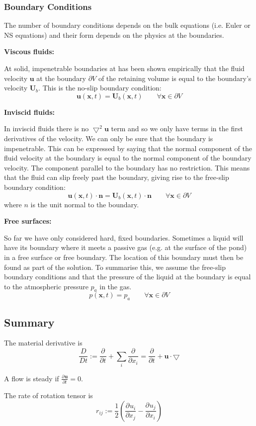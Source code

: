 \documentclass[11pt]{article}
\newcommand*{\pd}[3][]{\ensuremath{\frac{\partial^{#1} {#2}}{\partial {#3}^{#1}}}}
\newcommand*{\md}[1]{\ensuremath{\frac{D #1}{D t}}}
\newcommand{\grad}{\bigtriangledown}
\newcommand{\defeq}{:=}
\newcommand{\mv}[1]{\bm{#1}}
\newcommand{\mdf}[1]{{\color{red}#1}}
\begin{document}
\subsubsection{Boundary Conditions}
The number of boundary conditions depends on the bulk equations (i.e. Euler or NS equations) and their form depends on the physics at the boundaries.

\textbf{Viscous fluids:}

At solid, impenetrable boundaries at has been shown empirically that the fluid velocity $\mv{u}$ at the boundary $\partial V$ of the retaining volume is equal to the boundary's velocity $\mv{U}_b$. This is the \mdf{no-slip boundary condition}:
$$\mv{u}(\mv{x},t)=\mv{U}_b(\mv{x},t)\quad\quad\forall\mv{x}\in\partial V$$

\textbf{Inviscid fluids:}

In inviscid fluids there is no $\grad^2 \mv{u}$ term and so we only have terms in the first derivatives of the velocity.
We can only be sure that the boundary is impenetrable.
This can be expressed by saying that the normal component of the fluid velocity at the boundary is equal to the normal component of the boundary velocity.
The component parallel to the boundary has no restriction.
This means that the fluid can slip freely past the boundary, giving rise to the \mdf{free-slip boundary condition}:
$$\mv{u}(\mv{x},t)\cdot\mv{n}=\mv{U}_b(\mv{x},t)\cdot\mv{n}\quad\quad\forall\mv{x}\in\partial V$$
where $n$ is the unit normal to the boundary.

\textbf{Free surfaces:}

So far we have only considered hard, fixed boundaries. Sometimes a liquid will have its boundary where it meets a passive gas (e.g. at the surface of the pond) in a \mdf{free surface} or \mdf{free boundary}.
The location of this boundary must then be found as part of the solution.
To summarise this, we assume the free-slip boundary conditions and that the pressure of the liquid at the boundary is equal to the atmospheric pressure $p_a$ in the gas.
$$p(\mv{x},t)=p_a\quad\quad\forall\mv{x}\in\partial V$$

\subsection{Summary}
The \mdf{material derivative} is
$$\md{}\defeq\pd{}{t}+\sum_i \pd{}{x_i}=\pd{}{t}+\mv{u}\cdot\grad$$

A flow is \mdf{steady} if $\pd{\mv{u}}{t}=0$.

The \mdf{rate of rotation tensor} is 
$$r_{ij}\defeq\frac{1}{2}\left(\pd{u_i}{x_j}-\pd{u_j}{x_i}\right)$$
\end{document}

